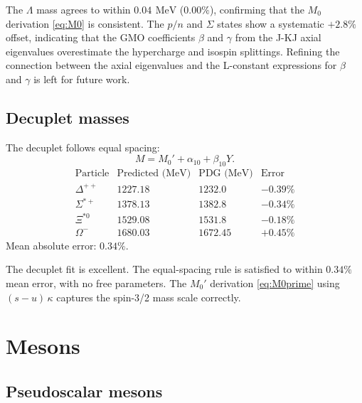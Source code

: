 \documentclass[aps,prd,reprint,twocolumn,showpacs,superscriptaddress]{revtex4-2}
\newcommand{\mev}{\,\text{MeV}}
\begin{document}
The $\Lambda$ mass agrees to within $0.04\ \mev$ ($0.00\%$), confirming
that the $M_0$ derivation \eqref{eq:M0} is consistent.  The $p/n$ and
$\Sigma$ states show a systematic $+2.8\%$ offset, indicating that the
GMO coefficients $\beta$ and $\gamma$ from the J-KJ axial eigenvalues
overestimate the hypercharge and isospin splittings.  Refining the
connection between the axial eigenvalues and the L-constant expressions
for $\beta$ and $\gamma$ is left for future work.

\subsection{Decuplet masses}

The decuplet follows equal spacing:
\begin{equation}
M = M_0' + \alpha_{10} + \beta_{10} Y.
\label{eq:gmo_decuplet}
\end{equation}
\[
\begin{array}{lcccr}
\text{Particle} & \text{Predicted (MeV)} & \text{PDG (MeV)} & \text{Error} \\
\Delta^{++}     & 1227.18  & 1232.0   & -0.39\% \\
\Sigma^{*+}     & 1378.13  & 1382.8   & -0.34\% \\
\Xi^{*0}        & 1529.08  & 1531.8   & -0.18\% \\
\Omega^-        & 1680.03  & 1672.45  & +0.45\%
\end{array}
\]
Mean absolute error: $0.34\%$.

The decuplet fit is excellent.  The equal-spacing rule is satisfied
to within $0.34\%$ mean error, with no free parameters.  The $M_0'$
derivation \eqref{eq:M0prime} using $(s-u)\,\kappa$ captures the
spin-3/2 mass scale correctly.

\section{Mesons}
\label{sec:mesons}

\subsection{Pseudoscalar mesons}
\end{document}
